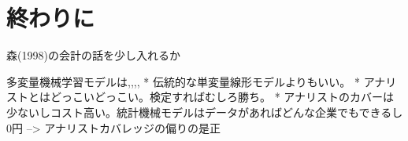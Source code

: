 \documentclass[a4paper, 12pt]{jsarticle}
\begin{document}
\part{終わりに}

森(1998)の会計の話を少し入れるか

多変量機械学習モデルは,,,,
* 伝統的な単変量線形モデルよりもいい。
* アナリストとはどっこいどっこい。検定すればむしろ勝ち。
* アナリストのカバーは少ないしコスト高い。統計機械モデルはデータがあればどんな企業でもできるし0円
--> アナリストカバレッジの偏りの是正



\end{document}
